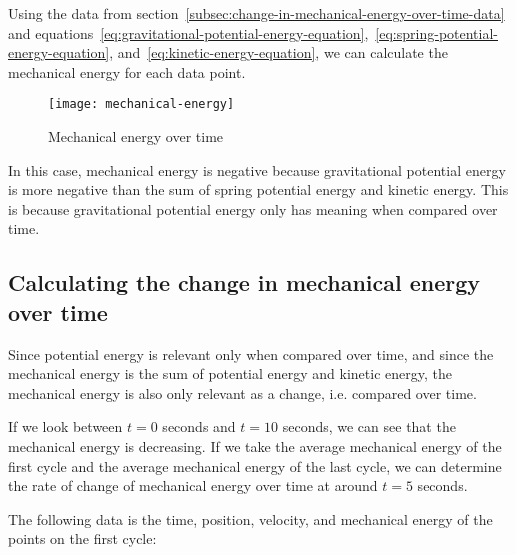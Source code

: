 \documentclass{article}
\begin{document}
                Using the data from section~\ref{subsec:change-in-mechanical-energy-over-time-data} and equations~\ref{eq:gravitational-potential-energy-equation},~\ref{eq:spring-potential-energy-equation}, and~\ref{eq:kinetic-energy-equation}, we can calculate the mechanical energy for each data point.
                
                \begin{figure}[H]
                    \centering
                    \texttt{[image: mechanical-energy]}
                    \caption{Mechanical energy over time}
                    \label{fig:mechanical-energy}
                \end{figure}
                
                In this case, mechanical energy is negative because gravitational potential energy is more negative than the sum of spring potential energy and kinetic energy.
                This is because gravitational potential energy only has meaning when compared over time.
        
        \subsection{Calculating the change in mechanical energy over time}
            Since potential energy is relevant only when compared over time, and since the mechanical energy is the sum of potential energy and kinetic energy, the mechanical energy is also only relevant as a change, i.e. compared over time.
            
            
            If we look between $t=0$ seconds and $t=10$ seconds, we can see that the mechanical energy is decreasing.
            If we take the average mechanical energy of the first cycle and the average mechanical energy of the last cycle, we can determine the rate of change of mechanical energy over time at around $t = 5$ seconds.
            
            
            The following data is the time, position, velocity, and mechanical energy of the points on the first cycle:
            
\end{document}
